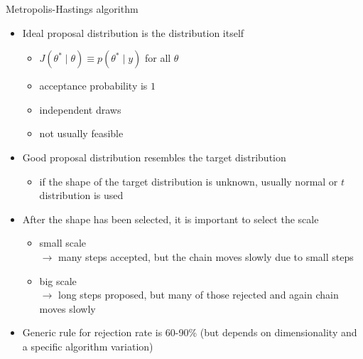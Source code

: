\documentclass[finnish,english,t]{beamer}
\begin{document}
\begin{frame}{Metropolis-Hastings algorithm}

  \begin{itemize}
  \item Ideal proposal distribution is the distribution itself
    \begin{itemize}
    \item $J(\theta^{*} \mid \theta)\equiv p(\theta^{*} \mid y)$ for all
      $\theta$
    \item acceptance probability is $1$
    \item independent draws
    \item not usually feasible
    \end{itemize}
  \item<2-> Good proposal distribution resembles the target distribution
    \begin{itemize}
    \item if the shape of the target distribution is unknown, usually
      normal or $t$ distribution is used
    \end{itemize}
  \item<3-> After the shape has been selected, it is important to select the scale
    \begin{itemize}
    \item small scale \\$\rightarrow$ many steps accepted, but the chain moves slowly due to small steps
    \item big scale \\$\rightarrow$ long steps proposed, but many of
      those rejected and again chain moves slowly
    \end{itemize}
  \item<4-> Generic rule for rejection rate is 60-90\% (but depends on
    dimensionality and a specific algorithm variation)
\end{itemize}

\end{frame}



\end{document}
